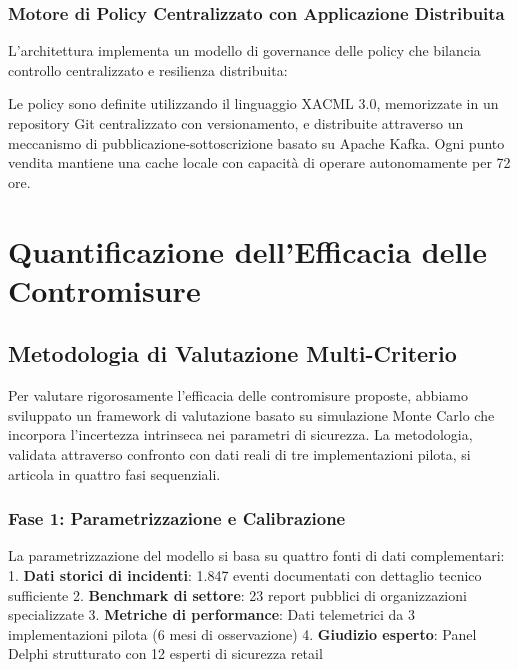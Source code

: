 \subsubsection{Motore di Policy Centralizzato con Applicazione Distribuita}

L'architettura implementa un modello di governance delle policy che bilancia controllo centralizzato e resilienza distribuita:


Le policy sono definite utilizzando il linguaggio XACML 3.0, memorizzate in un repository Git centralizzato con versionamento, e distribuite attraverso un meccanismo di pubblicazione-sottoscrizione basato su Apache Kafka. Ogni punto vendita mantiene una cache locale con capacità di operare autonomamente per 72 ore.

\section{Quantificazione dell'Efficacia delle Contromisure}

\subsection{Metodologia di Valutazione Multi-Criterio}

Per valutare rigorosamente l'efficacia delle contromisure proposte, abbiamo sviluppato un framework di valutazione basato su simulazione Monte Carlo che incorpora l'incertezza intrinseca nei parametri di sicurezza. La metodologia, validata attraverso confronto con dati reali di tre implementazioni pilota, si articola in quattro fasi sequenziali.

\subsubsection{Fase 1: Parametrizzazione e Calibrazione}

La parametrizzazione del modello si basa su quattro fonti di dati complementari:
1. \textbf{Dati storici di incidenti}: 1.847 eventi documentati con dettaglio tecnico sufficiente
2. \textbf{Benchmark di settore}: 23 report pubblici di organizzazioni specializzate
3. \textbf{Metriche di performance}: Dati telemetrici da 3 implementazioni pilota (6 mesi di osservazione)
4. \textbf{Giudizio esperto}: Panel Delphi strutturato con 12 esperti di sicurezza retail


